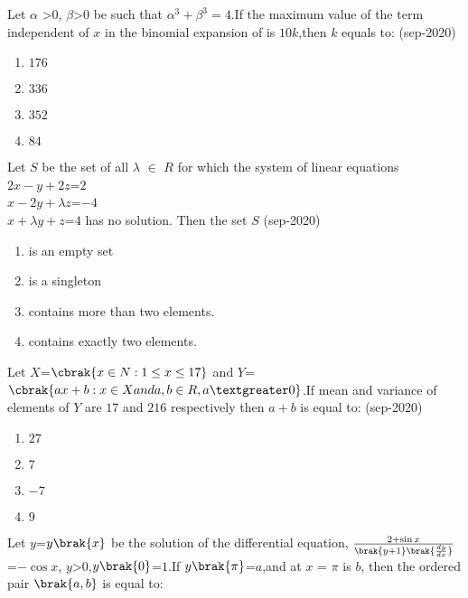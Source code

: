 \iffalse
\title{02-sep-2020 shift-1}
\author{EE24BTECH11060}
\section{mcq-single}
\fi
    \item Let $\alpha$ \textgreater $0$, $\beta$\textgreater$0$ be such that $\alpha^3+\beta^3=4$.If the maximum value of the term independent of $x$ in the binomial expansion of  is $10k$,then $k$ equals to:
    \hfill(sep-2020)
    \begin{enumerate}
        \item $176$
        \item $336$
        \item $352$
        \item $84$
    \end{enumerate}
    \item Let $S$ be the set of all $\lambda$ $\in$ $R$ for which the system of linear equations \\
    $2x-y+2z$=$2$\\
    $x-2y+\lambda z$=$-4$\\
    $x+\lambda y+z$=$4$ has no solution. Then the set $S$
    \hfill(sep-2020)
    \begin{enumerate}
        \item is an empty set
        \item is a singleton
        \item contains more than two elements.
        \item contains exactly two elements.
    \end{enumerate}
    \item Let $X$=$\cbrak{x\in N:1\leq x\leq 17}$ and $Y$=$\cbrak{ax+b:x \in X and a,b \in R,a \textgreater0}$.If mean and variance of elements of $Y$ are $17$ and $216$ respectively then $a+b$ is equal to:
    \hfill(sep-2020)
    \begin{enumerate}
        \item $27$
        \item $7$
        \item $-7$
        \item $9$
    \end{enumerate}
    \item Let $y$=$y\brak{x}$ be the solution of the differential equation, $\frac{2+\sin{x}}{\brak{y+1}\brak{\frac{dy}{dx}}}$=$-\cos{x}$, $y$\textgreater $0$,$y\brak{0}$=$1$.If $y\brak{\pi}$=$a$,and at $x$ = $\pi$ is $b$, then the ordered pair $\brak{a,b}$ is equal to:
